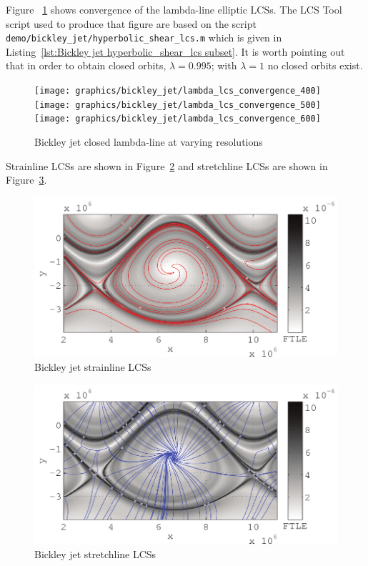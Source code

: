 \documentclass{article}
\begin{document}
Figure ~\ref{fig:Bickley jet lambda lcs convergence} shows convergence of the lambda-line elliptic LCSs. The LCS Tool script used to produce that figure are based on the script \lstinline!demo/bickley_jet/hyperbolic_shear_lcs.m! which is given in  Listing~\ref{lst:Bickley jet hyperbolic_shear_lcs subset}. It is worth pointing out that in order to obtain closed orbits, $\lambda = 0.995$; with $\lambda = 1$ no closed orbits exist.



\begin{figure}[hbt]
  \centering
  \texttt{[image: graphics/bickley\_jet/lambda\_lcs\_convergence\_400]}
\texttt{[image: graphics/bickley\_jet/lambda\_lcs\_convergence\_500]}
\texttt{[image: graphics/bickley\_jet/lambda\_lcs\_convergence\_600]}
  \caption{Bickley jet closed lambda-line at varying resolutions}
  \label{fig:Bickley jet lambda lcs convergence}
\end{figure}

Strainline LCSs are shown in Figure~\ref{fig:Bickley_jet_strain_lcs} and stretchline LCSs are shown in Figure~\ref{fig:Bickley_jet_stretch_lcs}.

\begin{figure}
  \centering
  \includegraphics[width=.85\textwidth]{graphics/bickley_jet/strain_lcs}
  \caption{Bickley jet strainline LCSs}
  \label{fig:Bickley_jet_strain_lcs}
\end{figure}

\begin{figure}
  \centering
  \includegraphics[width=.85\textwidth]{graphics/bickley_jet/stretch_lcs}
  \caption{Bickley jet stretchline LCSs}
  \label{fig:Bickley_jet_stretch_lcs}
\end{figure}
\end{document}
